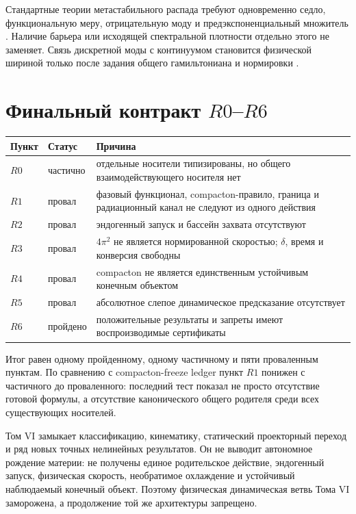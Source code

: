 Стандартные теории метастабильного распада требуют одновременно седло,
функциональную меру, отрицательную моду и предэкспоненциальный множитель
\cite{final-status-langer1969,final-status-coleman1977}. Наличие барьера
или исходящей спектральной плотности отдельно этого не заменяет. Связь
дискретной моды с континуумом становится физической шириной только после
задания общего гамильтониана и нормировки
\cite{final-status-fano1961}.

\section{Финальный контракт \texorpdfstring{$R0$--$R6$}{R0--R6}}

\begin{center}
\begin{tabular}{>{\raggedright\arraybackslash}p{}
                  >{\raggedright\arraybackslash}p{}
                  >{\raggedright\arraybackslash}p{}}
\toprule
Пункт & Статус & Причина \\
\midrule
$R0$ & частично & отдельные носители типизированы, но общего
взаимодействующего носителя нет \\
$R1$ & провал & фазовый функционал, compacton-правило, граница и
радиационный канал не следуют из одного действия \\
$R2$ & провал & эндогенный запуск и бассейн захвата отсутствуют \\
$R3$ & провал & $4\pi^2$ не является нормированной скоростью;
$\delta$, время и конверсия свободны \\
$R4$ & провал & compacton не является единственным устойчивым конечным
объектом \\
$R5$ & провал & абсолютное слепое динамическое предсказание отсутствует \\
$R6$ & пройдено & положительные результаты и запреты имеют
воспроизводимые сертификаты \\
\bottomrule
\end{tabular}
\end{center}

Итог равен одному пройденному, одному частичному и пяти проваленным
пунктам. По сравнению с compacton-freeze ledger пункт $R1$ понижен с
частичного до проваленного: последний тест показал не просто отсутствие
готовой формулы, а отсутствие канонического общего родителя среди всех
существующих носителей.

\begin{theorem}
Том VI замыкает классификацию, кинематику, статический проекторный
переход и ряд новых точных нелинейных результатов. Он не выводит
автономное рождение материи: не получены единое родительское действие,
эндогенный запуск, физическая скорость, необратимое охлаждение и
устойчивый наблюдаемый конечный объект. Поэтому физическая динамическая
ветвь Тома VI заморожена, а продолжение той же архитектуры запрещено.
\end{theorem}

